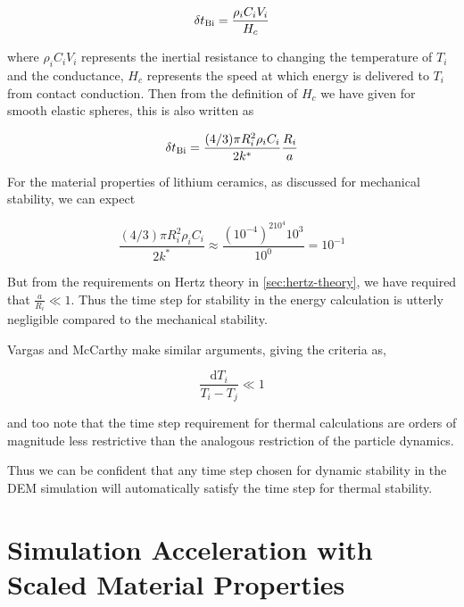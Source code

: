 \begin{equation}
	\delta t_{\mathrm{Bi}} = \frac{\rho_i C_i V_i}{H_c}
\end{equation}

where $\rho_i C_i V_i$ represents the inertial resistance to changing the temperature of $T_i$ and the conductance, $H_c$ represents the speed at which energy is delivered to $T_i$ from contact conduction. Then from the definition of $H_c$ we have given for smooth elastic spheres, this is also written as

\begin{equation}
	\delta t_{\mathrm{Bi}} = \frac{(4/3)\pi R_i^2\rho_i C_i}{2k^*}\frac{R_i}{a}
\end{equation}

For the material properties of lithium ceramics, as discussed for mechanical stability, we can expect

\begin{equation*}
	\frac{(4/3)\pi R_i^2\rho_i C_i}{2k^*} \approx \frac{(10^{-4})^210^{4}10^3}{10^0} = 10^{-1}
\end{equation*}

But from the requirements on Hertz theory in \cref{sec:hertz-theory}, we have required that $\frac{a}{R_i} \ll 1$. Thus the time step for stability in the energy calculation is utterly negligible compared to the mechanical stability.

Vargas and McCarthy\cite{Vargas2001} make similar arguments, giving the criteria as,

\begin{equation}
	\frac{\mathrm{d}T_i}{T_i - T_j} \ll 1
\end{equation}

and too note that the time step requirement for thermal calculations are orders of magnitude less restrictive than the analogous restriction of the particle dynamics.

Thus we can be confident that any time step chosen for dynamic stability in the DEM simulation will automatically satisfy the time step for thermal stability. 





\section{Simulation Acceleration with Scaled Material Properties}

